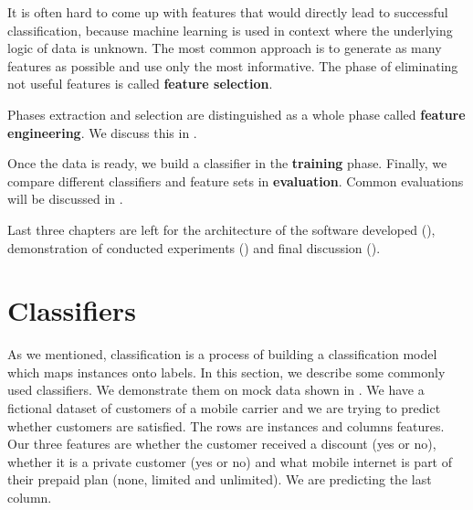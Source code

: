 It is often hard to come up with features that would directly lead to successful classification,
because machine learning is used in context where the underlying logic of data is unknown.
The most common approach is to generate as many features as possible and use only the most informative.
The phase of eliminating not useful features is called \textbf{feature selection}.

Phases extraction and selection are distinguished as a whole phase called \textbf{feature engineering}.
We discuss this in .
 


Once the data is ready, we build a classifier in the \textbf{training} phase.
Finally, we compare different classifiers and feature sets in \textbf{evaluation}.
Common evaluations will be discussed in .

Last three chapters  are left for the architecture of the software developed (),
demonstration of conducted experiments () and final discussion ().








\section{Classifiers}
\label{chap:clscon}

As we mentioned, classification is a process of building a classification model which maps
instances onto labels.
In this section, we describe some commonly used classifiers.
We demonstrate them on mock data shown in .
We have a fictional dataset of customers of a mobile carrier and
we are trying to predict whether customers are satisfied.
The rows are instances and columns features.
Our three features are 
whether the customer received a discount (yes or no), whether it is a private customer (yes or no)
and what mobile internet is part of their prepaid plan (none, limited and unlimited).
We are predicting the last column.

